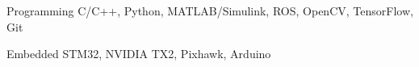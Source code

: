 

\begin{cvskills}

  \cvskill
    {Programming} %
    {C/C++, Python, MATLAB/Simulink, ROS, OpenCV, TensorFlow, Git} %

  \cvskill
    {Embedded} %
    {STM32, NVIDIA TX2, Pixhawk, Arduino} %

\end{cvskills}
